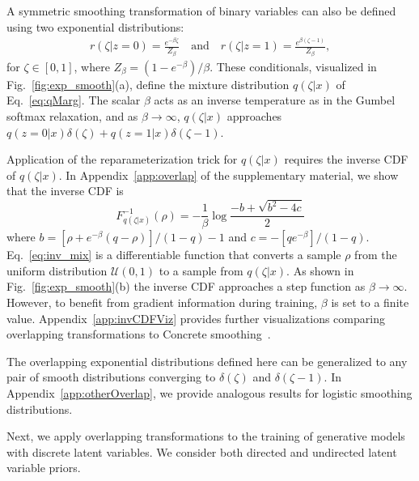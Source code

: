 \documentclass{article}
\begin{document}
A symmetric smoothing transformation of binary variables can also be defined using two exponential distributions:
\begin{align*}
r(\zeta | z = 0) = \frac{e^{- \beta \zeta}}{Z_\beta}       \quad \text{and} \quad r(\zeta | z = 1) = \frac{e^{\beta (\zeta - 1)}}{Z_\beta},
\end{align*}
for $\zeta\in [0,1]$, where $Z_\beta = (1 - e^{-\beta})/\beta$. These conditionals, visualized in Fig.~\ref{fig:exp_smooth}(a),
define the mixture distribution $q(\zeta|x)$ of Eq.~\eqref{eq:qMarg}.
The scalar $\beta$ acts as an inverse temperature as in the Gumbel softmax relaxation, and as $\beta \rightarrow \infty$, $q(\zeta|x)$ approaches $q(z=0|x)\delta(\zeta) + q(z=1|x)\delta(\zeta-1)$.

Application of the reparameterization trick for $q(\zeta|x)$ requires the inverse CDF of $q(\zeta|x)$. In Appendix~\ref{app:overlap} of the supplementary material, we show that the inverse CDF is
\begin{equation}
F^{-1}_{q(\zeta|x)}(\rho)= -\frac{1}{\beta} \log{\frac{-b + \sqrt{b^2 - 4c}}{2}} \label{eq:inv_mix}
\end{equation}
where $b =  [\rho + e^{-\beta}(q - \rho)]/(1 - q) -1$ and $c = -[q e^{-\beta}]/(1-q)$. 
Eq.~\eqref{eq:inv_mix} is a differentiable function that
converts a sample $\rho$ from the uniform distribution $\mathcal{U}(0,1)$ to a sample
from $q(\zeta|x)$. As shown in Fig.~\ref{fig:exp_smooth}(b) the inverse CDF approaches a step function as $\beta\rightarrow\infty$. However, to benefit from gradient information during training, $\beta$ is set to a finite value. Appendix~\ref{app:invCDFViz} provides further visualizations comparing overlapping transformations to Concrete smoothing~\cite{maddison2016concrete, jang2016categorical}.

The overlapping exponential distributions defined here can be generalized to any pair of smooth 
distributions converging to $\delta(\zeta)$ and $\delta(\zeta-1)$. In Appendix~\ref{app:otherOverlap}, we provide analogous results for logistic smoothing distributions.

Next, we apply overlapping transformations to the training of generative models with discrete latent variables. We consider both directed and 
undirected latent variable priors.
\end{document}

